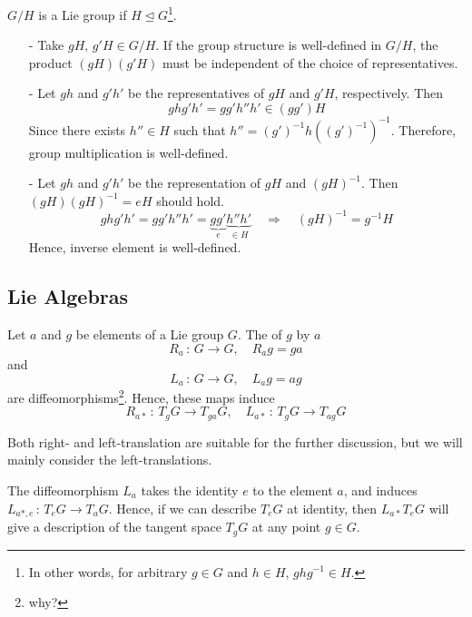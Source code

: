 \documentclass[a4paper, 10pt]{article}
\begin{document}
\begin{obs}
    $G/H$ is a Lie group if $H \trianglelefteq G$\footnote{In other words, for arbitrary $g \in  G$ and $h \in H$, $ghg^{-1} \in H$.}.
    \begin{itemize}
        \item[-] Take $gH,\, g'H \in G/H$. If the group structure is well-defined in $G/H$, the product $(gH)(g'H)$ must be independent of the choice of representatives.
        \item[-] Let $gh$ and $g'h'$ be the representatives of $gH$ and $g'H$, respectively. Then
        \[ ghg'h' = gg'h''h' \in (gg')H \]
        Since there exists $h'' \in H$ such that $h'' = (g')^{-1}h((g')^{-1})^{-1}$. Therefore, group multiplication is well-defined.
        \item[-] Let $gh$ and $g'h'$ be the representation of $gH$ and $(gH)^{-1}$. Then $(gH)(gH)^{-1} = eH$ should hold.
        \[ ghg'h' = gg'h''h' = \underbrace{gg'}_{e}\underbrace{h''h'}_{\in H} \quad \Longrightarrow \quad (gH)^{-1} = g^{-1}H \]
        Hence, inverse element is well-defined.
    \end{itemize}
\end{obs}

\newpage


\subsection{Lie Algebras}

\begin{definition}[Translations]
    Let $a$ and $g$ be elements of a Lie group $G$. The  of $g$ by $a$
    \[ R_{a} \,:\, G \rightarrow G, \quad R_{a}g = ga \]
    and
    \[ L_{a} \,:\, G \rightarrow G, \quad L_{a}g = ag \]
    are diffeomorphisms\footnote{why?}. Hence, these maps induce
    \[ R_{a\ast} \,:\, T_{g}G \rightarrow T_{ga}G, \quad L_{a\ast} \,:\, T_{g}G \rightarrow T_{ag}G \]
\end{definition}

\begin{remark}
    Both right- and left-translation are suitable for the further discussion, but we will mainly consider the left-translations.
\end{remark}

\begin{obs}
    The diffeomorphism $L_{a}$ takes the identity $e$ to the element $a$, and induces $L_{a\ast,e} \,:\, T_{e}G \rightarrow T_{a}G$. Hence, if we can describe $T_{e}G$ at identity, then $L_{a\ast}T_{e}G$ will give a description of the tangent space $T_{g}G$ at any point $g \in G$.
\end{obs}
\end{document}
